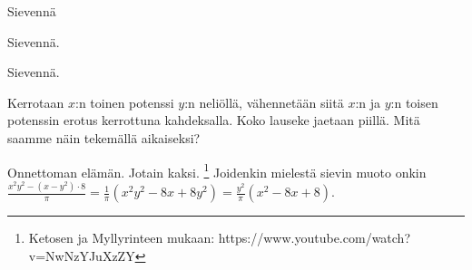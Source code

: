 \begin{tehtavasivu}
\begin{tehtava}
        Sievennä
        \begin{vastaus}
        \end{vastaus}
    \end{tehtava}

        \begin{tehtava}
     Sievennä.
        \begin{vastaus}
        \end{vastaus}
    \end{tehtava}
    
        \begin{tehtava}
        \begin{vastaus}
        \end{vastaus}
    \end{tehtava}
    
        \begin{tehtava}
        Sievennä.
        \begin{vastaus}
        \end{vastaus}
    \end{tehtava}
    
    \begin{tehtava}
    Kerrotaan $x$:n toinen potenssi $y$:n neliöllä, vähennetään siitä $x$:n ja $y$:n toisen potenssin erotus kerrottuna kahdeksalla. Koko lauseke jaetaan piillä. Mitä saamme näin tekemällä aikaiseksi?
    	\begin{vastaus}
    	Onnettoman elämän. Jotain kaksi. \footnote{Ketosen ja Myllyrinteen mukaan: https://www.youtube.com/watch?v=NwNzYJuXzZY} Joidenkin mielestä sievin muoto onkin $\frac{x^2y^2-(x-y^2)\cdot 8}{\pi}=\frac{1}{\pi}(x^2y^2-8x+8y^2)=\frac{y^2}{\pi}(x^2-8x+8)$.
    	\end{vastaus}
    \end{tehtava}


\end{tehtavasivu}
